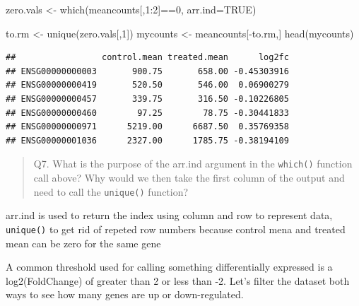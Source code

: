 \documentclass[
]{article}
\newenvironment{Shaded}{\begin{snugshade}}{\end{snugshade}}
\newcommand{\AttributeTok}[1]{\textcolor[rgb]{0.77,0.63,0.00}{#1}}
\newcommand{\ConstantTok}[1]{\textcolor[rgb]{0.00,0.00,0.00}{#1}}
\newcommand{\DecValTok}[1]{\textcolor[rgb]{0.00,0.00,0.81}{#1}}
\newcommand{\FunctionTok}[1]{\textcolor[rgb]{0.00,0.00,0.00}{#1}}
\newcommand{\NormalTok}[1]{#1}
\newcommand{\OtherTok}[1]{\textcolor[rgb]{0.56,0.35,0.01}{#1}}
\newcommand{\SpecialCharTok}[1]{\textcolor[rgb]{0.00,0.00,0.00}{#1}}
\begin{document}
\begin{Shaded}
\begin{Highlighting}[]
\NormalTok{zero.vals }\OtherTok{\textless{}{-}} \FunctionTok{which}\NormalTok{(meancounts[,}\DecValTok{1}\SpecialCharTok{:}\DecValTok{2}\NormalTok{]}\SpecialCharTok{==}\DecValTok{0}\NormalTok{, }\AttributeTok{arr.ind=}\ConstantTok{TRUE}\NormalTok{)}

\NormalTok{to.rm }\OtherTok{\textless{}{-}} \FunctionTok{unique}\NormalTok{(zero.vals[,}\DecValTok{1}\NormalTok{])}
\NormalTok{mycounts }\OtherTok{\textless{}{-}}\NormalTok{ meancounts[}\SpecialCharTok{{-}}\NormalTok{to.rm,]}
\FunctionTok{head}\NormalTok{(mycounts)}
\end{Highlighting}
\end{Shaded}

\begin{verbatim}
##                 control.mean treated.mean      log2fc
## ENSG00000000003       900.75       658.00 -0.45303916
## ENSG00000000419       520.50       546.00  0.06900279
## ENSG00000000457       339.75       316.50 -0.10226805
## ENSG00000000460        97.25        78.75 -0.30441833
## ENSG00000000971      5219.00      6687.50  0.35769358
## ENSG00000001036      2327.00      1785.75 -0.38194109
\end{verbatim}

\begin{quote}
Q7. What is the purpose of the arr.ind argument in the \texttt{which()}
function call above? Why would we then take the first column of the
output and need to call the \texttt{unique()} function?
\end{quote}

arr.ind is used to return the index using column and row to represent
data, \texttt{unique()} to get rid of repeted row numbers because
control mena and treated mean can be zero for the same gene

A common threshold used for calling something differentially expressed
is a log2(FoldChange) of greater than 2 or less than -2. Let's filter
the dataset both ways to see how many genes are up or down-regulated.

\begin{Shaded}
\end{Shaded}
\end{document}
